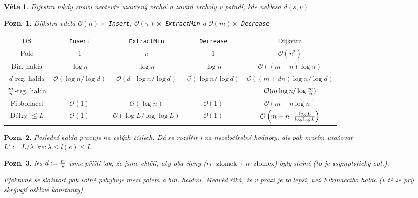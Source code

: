 \documentclass{article}
\theoremstyle{noparens}
\newtheorem*{thm}{Věta}
\theoremstyle{noparens-mys}
\theoremstyle{noparens-note}
\newtheorem*{note}{Pozn.}
\newcommand{\OO}{\mathcal{O}}
\begin{document}
\begin{thm}
    Dijkstra nikdy znovu neotevře uzavřený vrchol a zavírá vrcholy v pořadí,
    kde neklesá $d(s, v)$.
\end{thm}

\begin{note}
    Dijkstra udělá $\OO(n)\times$ \texttt{Insert}, $\OO(n)\times$
    \texttt{ExtractMin} a $\OO(m)\times$
    \texttt{Decrease}
\end{note}

\begin{center}
\begin{tabular}{ c c c c c }
DS              & \texttt{Insert}           & \texttt{ExtractMin}
                & \texttt{Decrease}         & Dijkstra \\
Pole            & $1$                       & $n$
                & $1$                       & $\OO(n^2)$ \\  
Bin. halda      & $\log n$                  & $\log n$
                & $\log n$                  & $\OO((m + n) \log n)$ \\  
$d$-reg. halda  & $\OO(\log n / \log d)$    & $\OO(d \cdot \log n / \log d)$
                & $\OO(\log n / \log d)$    & $\OO((m + dn) \log n / \log d)$ \\
$m\over n$-reg. halda  & ~ & ~ & ~			& $\OO(m \log n / \log {m\over n})$ \\
Fibbonacci      & $\OO(1)$					& $\OO(\log n)$
				& $\OO(1)$					& $\OO(m + n \log n)$ \\
Délky $\le L$   & $\OO(1)$                  & $\OO(\log L / \log \log L)$
				& $\OO(1)$					& $\OO\left(m + n \cdot {{\log L} \over {\log \log L}}\right)$
\end{tabular}
\end{center}

\begin{note}
    Poslední halda pracuje na celých číslech. Dá se rozšířit i na neceločíselné
    hodnoty, ale pak musím uvažovat $L' := L / \lambda, \forall e: \lambda \le
    l(e) \le L$
\end{note}

\begin{note}
    Na $d := {m\over n}$ jsme přišli tak, že jsme chtěli, aby oba členy ($m
    \cdot \text{zlomek} + n \cdot \text{zlomek}$) byly stejné (to je
    asymptoticky opt.).

	Efektivně se složitost pak volně pohybuje mezi polem a bin. haldou.  Medvěd
    říká, že v praxi je to lepší, než Fibonacciho halda (v té se prý skrývají
    ošklivé konstanty).
\end{note}
\end{document}
